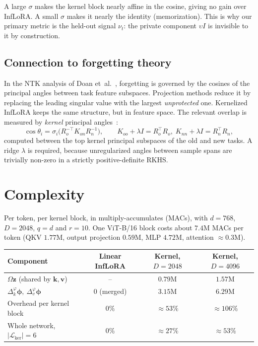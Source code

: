 \documentclass[11pt]{article}
\theoremstyle{plain}
\theoremstyle{definition}
\theoremstyle{remark}
\newcommand{\Lk}{\mathcal{L}_{\mathrm{ker}}}
\newcommand{\z}{\bm{z}}
\newcommand{\vphi}{\bm{\phi}}
\begin{document}
A large $\sigma$ makes the kernel block nearly affine in the cosine, giving no gain over InfLoRA. A small $\sigma$ makes it nearly the identity (memorization). This is why our primary metric is the held-out signal $\nu_t$: the private component $\upsilon I$ is invisible to it by construction.

\subsection{Connection to forgetting theory}
In the NTK analysis of Doan et~al.~\cite{doan}, forgetting is governed by the cosines of the principal angles between task feature subspaces. Projection methods reduce it by replacing the leading singular value with the largest \emph{unprotected} one. Kernelized InfLoRA keeps the same structure, but in feature space. The relevant overlap is measured by \emph{kernel} principal angles~\cite{wolfshashua}:
\begin{equation}\label{eq:kpa}
\cos\theta_i=\sigma_i\big(R_o^{-\top}K_{on}R_n^{-1}\big),\qquad K_{oo}+\lambda I=R_o^{\top}R_o,\;K_{nn}+\lambda I=R_n^{\top}R_n,
\end{equation}
computed between the top kernel principal subspaces of the old and new tasks. A ridge $\lambda$ is required, because unregularized angles between sample spans are trivially non-zero in a strictly positive-definite RKHS.

\section{Complexity}\label{sec:cost}

Per token, per kernel block, in multiply-accumulates (MACs), with $d=768$, $D=2048$, $q=d$ and $r=10$. One ViT-B/16 block costs about $7.4$M MACs per token (QKV $1.77$M, output projection $0.59$M, MLP $4.72$M, attention $\approx0.3$M).

\begin{center}
\begin{tabular}{@{}lccc@{}}
\toprule
Component & Linear InfLoRA & Kernel, $D=2048$ & Kernel, $D=4096$\\
\midrule
$\Omega\z$ (shared by $\bm k,\bm v$) & -- & $0.79$M & $1.57$M\\
$\Delta^\varphi_k\vphi,\ \Delta^\varphi_v\vphi$ & 0 (merged) & $3.15$M & $6.29$M\\
Overhead per kernel block & $0\%$ & $\approx 53\%$ & $\approx 106\%$\\
Whole network, $|\Lk|=6$ & $0\%$ & $\approx 27\%$ & $\approx 53\%$\\
\bottomrule
\end{tabular}
\end{center}
\end{document}
